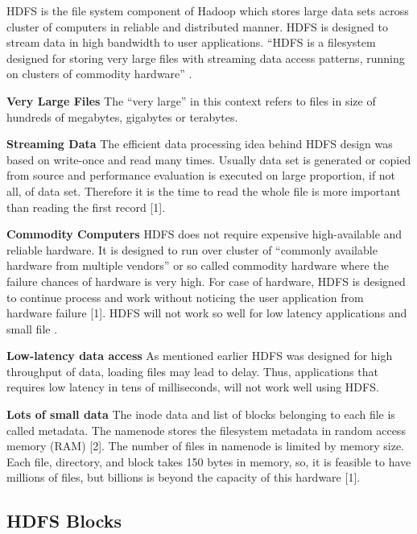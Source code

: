HDFS is the file system component of Hadoop which stores large data sets across cluster of computers in reliable and distributed manner. HDFS is designed to stream data in high bandwidth to user applications.
“HDFS is a filesystem designed for storing very large files with streaming data access patterns, running on clusters of commodity hardware” \cite{tom3} \cite{Reference2}.

\textbf{Very Large Files} 
  The “very large” in this context refers to files in size of hundreds of megabytes, gigabytes or terabytes.

\textbf{Streaming Data}
  The efficient data processing idea behind HDFS design was based on write-once and read many times. Usually data set is generated or copied from source and performance evaluation is executed on large proportion, if not all, of data set. Therefore it is the time to read the whole file is more important than reading the first record [1]. 
  
\textbf{Commodity Computers}
   HDFS does not require expensive high-available and reliable hardware. It is designed to run over cluster of  “commonly available hardware from multiple vendors” or so called commodity hardware where the  failure chances of hardware is very high. For case of hardware, HDFS is designed to continue process and work without noticing the user application from hardware failure [1]. 
HDFS will not work so well for low latency applications and small file . 

\textbf{Low-latency data access}
As mentioned earlier HDFS was designed for high throughput of data, loading files may lead to delay. Thus, applications that requires low latency in tens of milliseconds, will not work well using HDFS. 

\textbf{Lots of small data}
The inode data and list of blocks belonging to each file is called metadata. The namenode stores the filesystem metadata in random access memory (RAM) [2]. The number of files in namenode is limited by memory size. Each file, directory, and block takes 150 bytes in memory, so, it is feasible to have millions of files, but billions is beyond the capacity of this hardware [1].
   
\subsection{HDFS Blocks}
 
